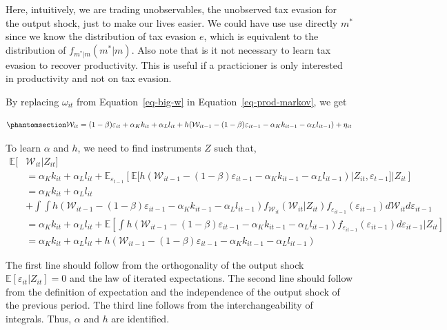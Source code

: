 \documentclass[
  12pt]{article}
\theoremstyle{definition}
\theoremstyle{remark}
\begin{document}
Here, intuitively, we are trading unobservables, the unobserved tax
evasion for the output shock, just to make our lives easier. We could
have use use directly \(m^*\) since we know the distribution of tax
evasion \(e\), which is equivalent to the distribution of
\(f_{m^*|m}(m^*|m)\). Also note that is it not necessary to learn tax
evasion to recover productivity. This is useful if a practicioner is
only interested in productivity and not on tax evasion.

By replacing \(\omega_{it}\) from Equation~\ref{eq-big-w} in
Equation~\ref{eq-prod-markov}, we get

\begin{equation}\phantomsection\label{eq-big-w-reg}{
\begin{aligned}
    \mathcal W_{it}=(1-\beta)\varepsilon_{it}+\alpha_K k_{it}+\alpha_L l_{it}+h(\mathcal W_{it-1}-(1-\beta)\varepsilon_{it-1}-\alpha_K k_{it-1}-\alpha_L l_{it-1})+\eta_{it}
\end{aligned}
}\end{equation}

To learn \(\alpha\) and \(h\), we need to find instruments \(Z\) such
that, \[
\begin{aligned}    
 \mathbb{E}[&\mathcal{W}_{it}|Z_{it}]\\
 &=\alpha_K k_{it}+\alpha_L l_{it}+\mathbb{E}_{\varepsilon_{t-1}}\left[\mathbb{E}[ h(\mathcal W_{it-1}-(1-\beta)\varepsilon_{it-1}-\alpha_K k_{it-1}-\alpha_L l_{it-1})|Z_{it},\varepsilon_{t-1}]|Z_{it}\right]\\
 &=\alpha_K k_{it}+\alpha_L l_{it}\\
 &+\int\int h(\mathcal W_{it-1}-(1-\beta)\varepsilon_{it-1}-\alpha_K k_{it-1}-\alpha_L l_{it-1})f_{\mathcal{W}_{it}}(\mathcal{W}_{it}|Z_{it})f_{\varepsilon_{it-1}}(\varepsilon_{it-1})d\mathcal{W}_{it}d\varepsilon_{it-1}\\
 &=\alpha_K k_{it}+\alpha_L l_{it}+\mathbb{E}\left[\int h(\mathcal W_{it-1}-(1-\beta)\varepsilon_{it-1}-\alpha_K k_{it-1}-\alpha_L l_{it-1})f_{\varepsilon_{it-1}}(\varepsilon_{it-1})d\varepsilon_{it-1}|Z_{it}\right]\\
&=\alpha_K k_{it}+\alpha_L l_{it}+h(\mathcal W_{it-1}-(1-\beta)\varepsilon_{it-1}-\alpha_K k_{it-1}-\alpha_L l_{it-1})
\end{aligned}
\]

The first line should follow from the orthogonality of the output shock
\(\mathbb{E}[\varepsilon_{it}|Z_{it}]=0\) and the law of iterated
expectations. The second line should follow from the definition of
expectation and the independence of the output shock of the previous
period. The third line follows from the interchangeability of integrals.
Thus, \(\alpha\) and \(h\) are identified.
\end{document}
